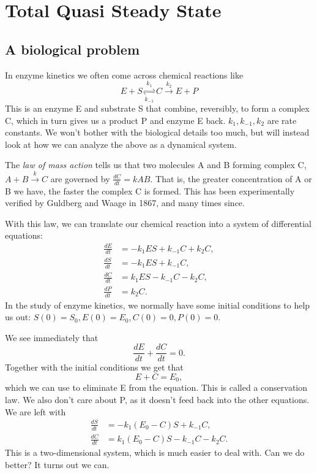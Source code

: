 \documentclass[12pt]{article}
\begin{document}
\section{Total Quasi Steady State}
\subsection{A biological problem}

In enzyme kinetics we often come across chemical reactions like
\begin{equation}
E + S \underset{k_{-1}}{\overset{k_{1}}\rightleftharpoons} C
 \overset{k_2}\longrightarrow E + P
\end{equation}
This is an enzyme E and substrate S that combine, reversibly, to form
a complex C, which in turn gives us a product P and enzyme E back.
$k_1, k_{-1}, k_2$ are rate constants. We won't bother with the
biological details too much, but will instead look at how we can
analyze the above as a dynamical system.

The \textit{law of mass action} tells us that two molecules A and B
forming complex C, $A+B \overset{k}\longrightarrow C$ are governed by
$\frac{dC}{dt} = kAB$. That is, the greater concentration of A or B we
have, the faster the complex C is formed. This has been
experimentally verified by Guldberg and Waage in 1867, and many times
since.

With this law, we can translate our chemical reaction into a system of
differential equations:
\begin{align}
\frac{dE}{dt} &= -k_1ES + k_{-1}C + k_2C, \\
\frac{dS}{dt} &= -k_1ES + k_{-1}C, \\
\frac{dC}{dt} &= k_1ES - k_{-1}C - k_2C, \\
\frac{dP}{dt} &= k_2C.
\end{align}
In the study of enzyme kinetics, we normally have some initial conditions to help
us out: $S(0) = S_0, E(0) = E_0, C(0)=0, P(0)=0$.

We see immediately that
\begin{equation}
\frac{dE}{dt} + \frac{dC}{dt} = 0.
\end{equation}
Together with the initial conditions we get that
\begin{equation}
E + C = E_0,
\end{equation}
which we can use to eliminate E from the equation. This is called a conservation
law.  We also don't care about P, as it doesn't feed back into the other
equations. We are left with
\begin{align}
\frac{dS}{dt} &= -k_1(E_0 - C)S + k_{-1}C, \\
\frac{dC}{dt} &= k_1(E_0 - C)S - k_{-1}C - k_2 C.
\end{align}
This is a two-dimensional system, which is much easier to deal with. Can we do
better? It turns out we can.
\end{document}
